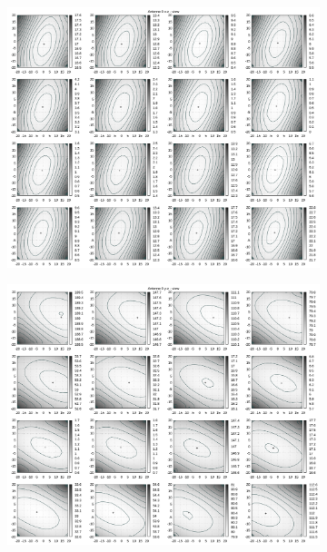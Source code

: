 %
\begin{figure}[!h]
	 \caption[Übrige Ebenen für Antenne 1]{Auf diesen Abbildungen zeigen sich die Fitness-Ebenen für die übrigen Ansichten, x-z und y-z. In der oberen Reihe sind Ebenen über den gesamten Bereich, in der Unteren vergrößert dargestellt. Zu erkennen ist ein zum Verlauf der x-y-Ebene sehr ähnliches Bild. Ein flaches, längliches Tal mit Minimum.  }
	 \label{fig:fitnessplanesA1}
     \centering
     \begin{subfigure}[t]{0.4\textwidth}
             \centering
             \includegraphics[width=\textwidth]{img/fitness/xz_a0.png}
     \end{subfigure}
     \qquad
     \begin{subfigure}[t]{0.4\textwidth}
			\centering
			\includegraphics[width=\textwidth]{img/fitness/yz_a0.png}

\end{subfigure}
\end{figure}
